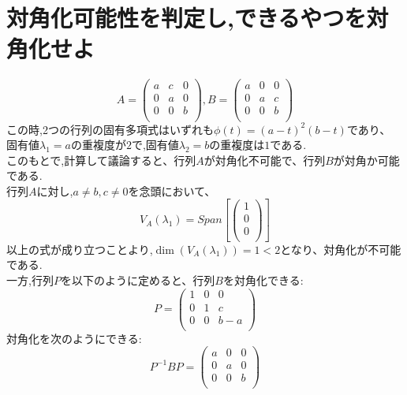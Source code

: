 \documentclass{jreport}
\begin{document}
\section{対角化可能性を判定し,できるやつを対角化せよ}
$$
A=
\left(
\begin{array}{ccc}
        a & c & 0\\
        0 & a & 0\\
        0 & 0 & b\\
\end{array}
\right)
,
B=
\left(
\begin{array}{ccc}
        a & 0 & 0\\
        0 & a & c\\
        0 & 0 & b\\
\end{array}
\right)
$$
この時,2つの行列の固有多項式はいずれも$\phi (t) =(a-t)^2(b-t)$であり、\\
固有値$\lambda_1 = a$の重複度が$2$で,固有値$\lambda_2 =b$の重複度は$1$である.\\
このもとで,計算して議論すると、行列$A$が対角化不可能で、行列$B$が対角か可能である.\\
行列$A$に対し,$a \ne b,c\ne 0$を念頭において、\\
$$
V_A(\lambda_1)=Span[\left(
                        \begin{array}{c}
                                1\\
                                0\\
                                0\\
                        \end{array}
                        \right)
                        ]
$$
以上の式が成り立つことより,$\dim(V_A(\lambda_1)) =1 <2$となり、対角化が不可能である.\\
一方,行列$P$を以下のように定めると、行列$B$を対角化できる:
$$
P=
\left(
\begin{array}{ccc}
         1 &  0 &  0\\
         0 &  1 &  c\\
         0 &  0 &  b-a\\
\end{array}
\right)
$$
対角化を次のようにできる:
$$
P^{-1}BP=
\left(
\begin{array}{ccc}
         a &  0 &  0\\
         0 &  a &  0\\
         0 &  0 &  b\\
\end{array}
\right)
$$
\end{document}
